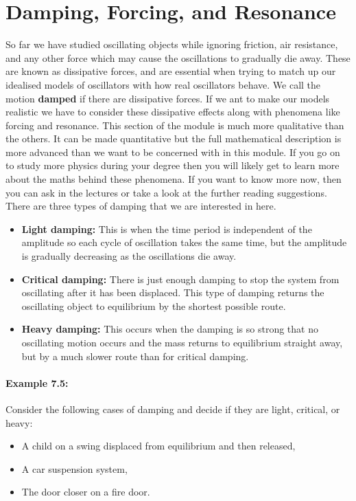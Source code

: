 \section{Damping, Forcing, and Resonance}
So far we have studied oscillating objects while ignoring friction, air resistance, and any other force which may cause the oscillations to gradually die away. These are known as dissipative forces, and are essential when trying to match up our idealised models of oscillators with how real oscillators behave. We call the motion \textbf{damped} if there are dissipative forces. If we ant to make our models realistic we have to consider these dissipative effects along with phenomena like forcing and resonance. This section of the module is much more qualitative than the others. It can be made quantitative but the full mathematical description is more advanced than we want to be concerned with in this module. If you go on to study more physics during your degree then you will likely get to learn more about the maths behind these phenomena. If you want to know more now, then you can ask in the lectures or take a look at the further reading suggestions. \\

There are three types of damping that we are interested in here.
\begin{itemize}
\setlength{\itemsep}{-5pt}
    \item \textbf{Light damping:} This is when the time period is independent of the amplitude so each cycle of oscillation takes the same time, but the amplitude is gradually decreasing as the oscillations die away. 
    \item \textbf{Critical damping:} There is just enough damping to stop the system from oscillating after it has been displaced. This type of damping returns the oscillating object to equilibrium by the shortest possible route.
    \item \textbf{Heavy damping:} This occurs when the damping is so strong that no oscillating motion occurs and the mass returns to equilibrium straight away, but by a much slower route than for critical damping.
\end{itemize}  

\paragraph{Example 7.5:} Consider the following cases of damping and decide if they are light, critical, or heavy:
\begin{itemize}
\setlength{\itemsep}{-5pt}
    \item[a)] A child on a swing displaced from equilibrium and then released,
    \item[b)] A car suspension system,
    \item[c)] The door closer on a fire door.
\end{itemize}  

